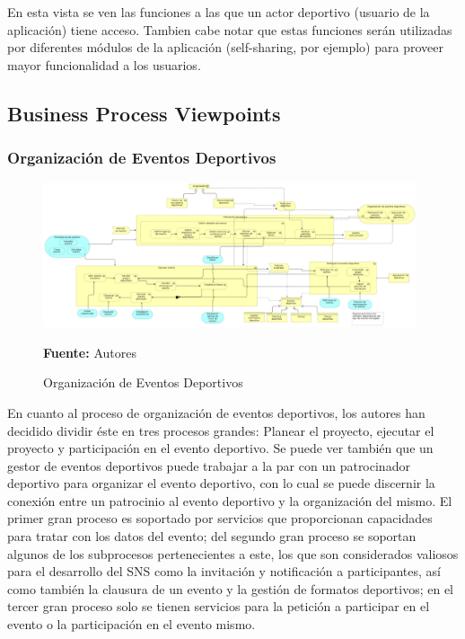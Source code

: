 En esta vista se ven las funciones a las que un actor deportivo (usuario de la aplicación) tiene acceso. Tambien cabe notar que estas funciones serán utilizadas por diferentes módulos de la aplicación (self-sharing, por ejemplo) para proveer mayor funcionalidad a los usuarios.

\subsection{Business Process Viewpoints}

\subsubsection{Organización de Eventos Deportivos}

\begin{figure}[!htb]
  \begin{center}
    \includegraphics[width=11cm]{./imagenes/Archimate/vistas/business_process/organizacioneventosdeportivos.png}
    \caption{Organización de Eventos Deportivos}
    \label{fig:bp_organizacion_eventos_deportivos}
    \textbf{Fuente:}  Autores
  \end{center}
\end{figure}

En cuanto al proceso de organización de eventos deportivos, los autores han decidido dividir éste en tres procesos grandes: Planear el proyecto, ejecutar el proyecto y participación en el evento deportivo. Se puede ver también que un gestor de eventos deportivos puede trabajar a la par con un patrocinador deportivo para organizar el evento deportivo, con lo cual se puede discernir la conexión entre un patrocinio al evento deportivo y la organización del mismo. El primer gran proceso es soportado por servicios que proporcionan capacidades para tratar con los datos del evento; del segundo gran proceso se soportan algunos de los subprocesos pertenecientes a este, los que son considerados valiosos para el desarrollo del SNS como la invitación y notificación a participantes, así como también la clausura de un evento y la gestión de formatos deportivos; en el tercer gran proceso solo se tienen servicios para la petición a participar en el evento o la participación en el evento mismo.

